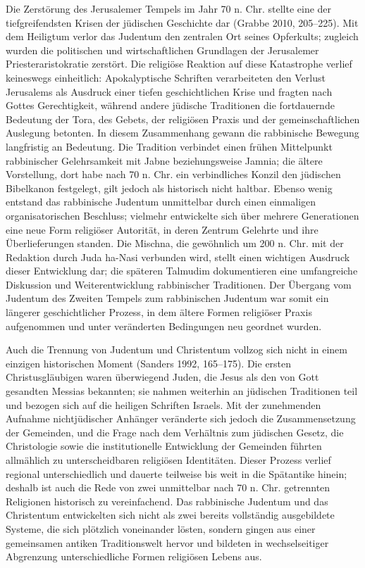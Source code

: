 \documentclass[fontsize=12pt]{mybib}
\begin{document}
Die Zerstörung des Jerusalemer Tempels im Jahr 70 n. Chr. stellte eine der tiefgreifendsten Krisen der jüdischen Geschichte dar (Grabbe 2010, 205–225). Mit dem Heiligtum verlor das Judentum den zentralen Ort seines Opferkults; zugleich wurden die politischen und wirtschaftlichen Grundlagen der Jerusalemer Priesteraristokratie zerstört. Die religiöse Reaktion auf diese Katastrophe verlief keineswegs einheitlich: Apokalyptische Schriften verarbeiteten den Verlust Jerusalems als Ausdruck einer tiefen geschichtlichen Krise und fragten nach Gottes Gerechtigkeit, während andere jüdische Traditionen die fortdauernde Bedeutung der Tora, des Gebets, der religiösen Praxis und der gemeinschaftlichen Auslegung betonten. In diesem Zusammenhang gewann die rabbinische Bewegung langfristig an Bedeutung. Die Tradition verbindet einen frühen Mittelpunkt rabbinischer Gelehrsamkeit mit Jabne beziehungsweise Jamnia; die ältere Vorstellung, dort habe nach 70 n. Chr. ein verbindliches Konzil den jüdischen Bibelkanon festgelegt, gilt jedoch als historisch nicht haltbar. Ebenso wenig entstand das rabbinische Judentum unmittelbar durch einen einmaligen organisatorischen Beschluss; vielmehr entwickelte sich über mehrere Generationen eine neue Form religiöser Autorität, in deren Zentrum Gelehrte und ihre Überlieferungen standen. Die Mischna, die gewöhnlich um 200 n. Chr. mit der Redaktion durch Juda ha-Nasi verbunden wird, stellt einen wichtigen Ausdruck dieser Entwicklung dar; die späteren Talmudim dokumentieren eine umfangreiche Diskussion und Weiterentwicklung rabbinischer Traditionen. Der Übergang vom Judentum des Zweiten Tempels zum rabbinischen Judentum war somit ein längerer geschichtlicher Prozess, in dem ältere Formen religiöser Praxis aufgenommen und unter veränderten Bedingungen neu geordnet wurden.

Auch die Trennung von Judentum und Christentum vollzog sich nicht in einem einzigen historischen Moment (Sanders 1992, 165–175). Die ersten Christusgläubigen waren überwiegend Juden, die Jesus als den von Gott gesandten Messias bekannten; sie nahmen weiterhin an jüdischen Traditionen teil und bezogen sich auf die heiligen Schriften Israels. Mit der zunehmenden Aufnahme nichtjüdischer Anhänger veränderte sich jedoch die Zusammensetzung der Gemeinden, und die Frage nach dem Verhältnis zum jüdischen Gesetz, die Christologie sowie die institutionelle Entwicklung der Gemeinden führten allmählich zu unterscheidbaren religiösen Identitäten. Dieser Prozess verlief regional unterschiedlich und dauerte teilweise bis weit in die Spätantike hinein; deshalb ist auch die Rede von zwei unmittelbar nach 70 n. Chr. getrennten Religionen historisch zu vereinfachend. Das rabbinische Judentum und das Christentum entwickelten sich nicht als zwei bereits vollständig ausgebildete Systeme, die sich plötzlich voneinander lösten, sondern gingen aus einer gemeinsamen antiken Traditionswelt hervor und bildeten in wechselseitiger Abgrenzung unterschiedliche Formen religiösen Lebens aus.
\end{document}

